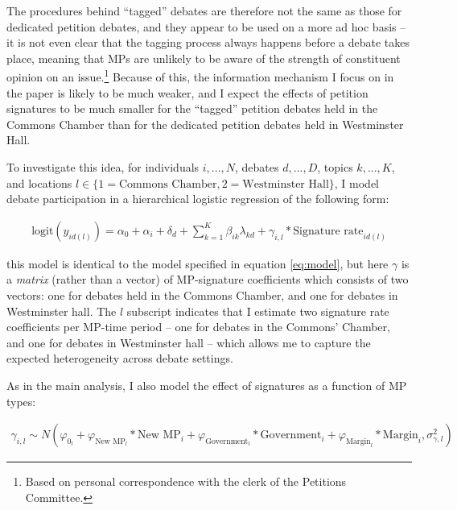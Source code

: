 \documentclass[12pt]{article}
\begin{document}
The procedures behind ``tagged'' debates are therefore not the same as those for dedicated petition debates, and they appear to be used on a more ad hoc basis -- it is not even clear that the tagging process always happens before a debate takes place, meaning that MPs are unlikely to be aware of the strength of constituent opinion on an issue.\footnote{Based on personal correspondence with the clerk of the Petitions Committee.} Because of this, the information mechanism I focus on in the paper is likely to be much weaker, and I expect the effects of petition signatures to be much smaller for the ``tagged'' petition debates held in the Commons Chamber than for the dedicated petition debates held in Westminster Hall. 

To investigate this idea, for individuals $i,...,N$, debates $d,...,D$, topics $k,...,K$, and locations $l \in \{1 = \text{Commons Chamber}, 2 = \text{Westminster Hall}\}$, I model debate participation in a hierarchical logistic regression of the following form:

\vspace{-0.5cm}
\begin{eqnarray}\label{eq:model_location}
\text{logit}(y_{id(l)}) =  \alpha_0 + \alpha_{i} + \delta_{d} + \sum_{k=1}^{K}\beta_{ik}\lambda_{kd}  + \gamma_{i,l}  * \text{Signature rate}_{id(l)}%
\end{eqnarray}

\noindent this model is identical to the model specified in equation \ref{eq:model}, but here $\gamma$ is a \emph{matrix} (rather than a vector) of MP-signature coefficients which consists of two vectors: one for debates held in the Commons Chamber, and one for debates in Westminster hall. The $l$ subscript indicates that I estimate two signature rate coefficients per MP-time period -- one for debates in the Commons' Chamber, and one for debates in Westminster hall -- which allows me to capture the expected heterogeneity across debate settings. 

As in the main analysis, I also model the effect of signatures as a function of MP types:

\vspace{-0.5cm}
\begin{eqnarray}\label{eq:gamma_priors_location}
\gamma_{i,l} \sim N(\varphi_{0_l} + \varphi_{\text{New MP}_l}*\text{New MP}_i + 
\varphi_{\text{Government}_l}*\text{Government}_i + \varphi_{\text{Margin}_l}*\text{Margin}_i, \sigma_{\gamma,l}^2)
\end{eqnarray}
\end{document}
